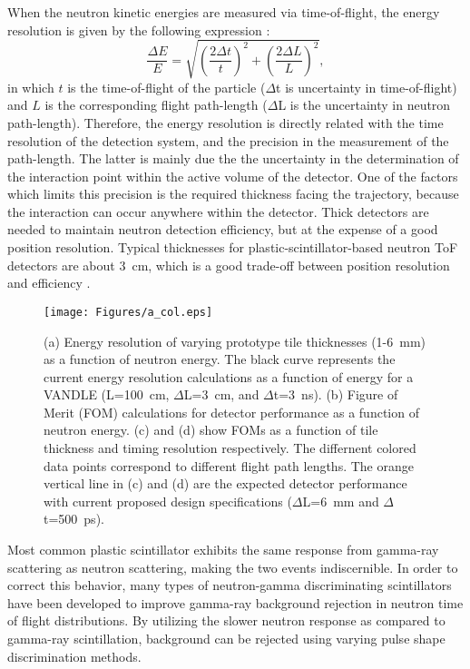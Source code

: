 \documentclass[preprint,3p,twocolumn]{elsarticle}
\begin{document}
When the neutron kinetic energies are measured via time-of-flight, the energy resolution is given by the following expression \cite{KORNILOV2009226}:
\begin{equation}
\frac{\Delta E}{E}=\sqrt{\left(\frac{2\Delta t}{t}\right )^2+\left(\frac{2\Delta L}{L}\right )^2},
\label{eq:resolution}
\end{equation}
in which $t$  is the time-of-flight of the particle ($\Delta$t is uncertainty in time-of-flight) and $L$ is the corresponding flight path-length ($\Delta$L is the uncertainty in neutron path-length). Therefore, the energy resolution is directly related with the time resolution of the detection system, and the precision in the measurement of the path-length. The latter is mainly due the the uncertainty in the determination of the interaction point within the active volume of the detector. One of the factors which limits this precision is the required thickness facing the trajectory, because the interaction can occur anywhere within the detector. Thick detectors are needed to maintain neutron detection efficiency, but at the expense of a good position resolution. Typical thicknesses for plastic-scintillator-based neutron ToF detectors are about 3~cm, which is a good trade-off between position resolution and efficiency \cite{PETERS2016122,BUTA2000412,MORRISSEY1997222}.
\begin{figure}[tp]
\centering
\texttt{[image: Figures/a\_col.eps]}
\caption{(a) Energy resolution of varying prototype tile thicknesses (1-6~mm) as a function of neutron energy. The black curve represents the current energy resolution calculations as a function of energy for a VANDLE (L=100~cm, $\Delta$L=3~cm, and $\Delta$t=3~ns). (b) Figure of Merit (FOM) calculations for detector performance as a function of neutron energy. (c) and (d) show FOMs as a function of tile thickness and timing resolution respectively. The differnent colored data points correspond to different flight path lengths. The orange vertical line in (c) and (d) are the expected detector performance with current proposed design specifications ($\Delta$L=6~mm and $\Delta$t=500~ps).}
\label{fig:resolution}
\end{figure}


Most common plastic scintillator exhibits the same response from gamma-ray scattering as neutron scattering, making the two events indiscernible. In order to correct this behavior, many types of neutron-gamma discriminating scintillators have been developed to improve gamma-ray background rejection in neutron time of flight distributions. By utilizing the slower neutron response as compared to gamma-ray scintillation, background can be rejected using varying pulse shape discrimination methods.
\end{document}
